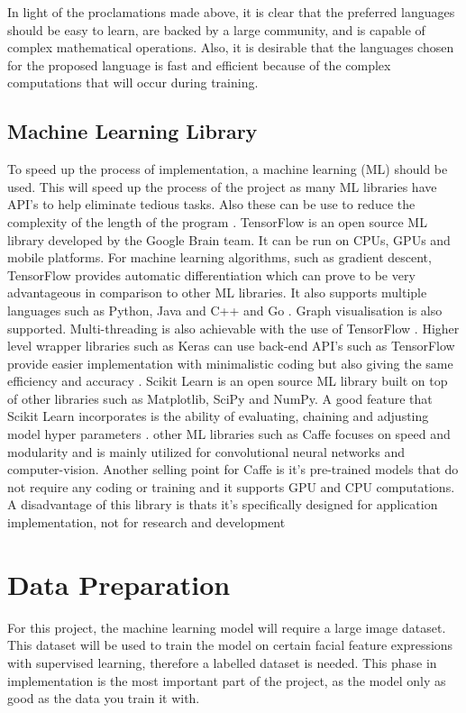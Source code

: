In light of the proclamations made above, it is clear that the preferred languages should be easy to learn, are backed by a large community, and is capable of complex mathematical operations. Also, it is desirable that the languages chosen for the proposed language is fast and efficient because of the complex computations that will occur during training.

\newpage

\subsection{Machine Learning Library}
To speed up the process of implementation, a machine learning (ML) should be used. This will speed up the process of the project as many ML libraries have API's to help eliminate tedious tasks. Also these can be use to reduce the complexity of the length of the program \citep{jain}.
TensorFlow is an open source ML library developed by the Google Brain team. It can be run on CPUs, GPUs and mobile platforms. For machine learning algorithms, such as gradient descent, TensorFlow provides automatic differentiation which can prove to be very advantageous in comparison to other ML libraries. It also supports multiple languages such as Python, Java and C++ and Go \citep{jain}. Graph visualisation is also supported. Multi-threading is also achievable with the use of TensorFlow \citep{jain}. Higher level wrapper libraries such as Keras can use back-end API's such as TensorFlow provide easier implementation with minimalistic coding but also giving the same efficiency and accuracy \citep{lee_keras}. Scikit Learn is an open source ML library built on top of other libraries such as Matplotlib, SciPy and NumPy. A good feature that Scikit Learn incorporates is the ability of evaluating, chaining and adjusting model hyper parameters \citep{jain}.
other ML libraries such as Caffe focuses on speed and modularity and is mainly utilized for convolutional neural networks and computer-vision. Another selling point for Caffe is it’s pre-trained models that do not require any coding or training and it supports GPU and CPU computations. A disadvantage of this library is thats it's specifically designed for application implementation, not for research and development \citep{jain}

\section{Data Preparation}
For this project, the machine learning model will require a large image dataset. This dataset will be used to train the model on certain facial feature expressions with supervised learning, therefore a labelled dataset is needed. This phase in implementation is the most important part of the project, as the model only as good as the data you train it with.

